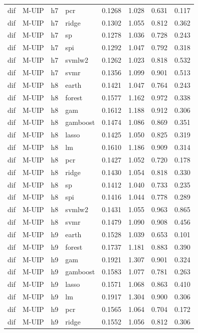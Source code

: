 \begin{ThreePartTable}
\begin{longtable}[t]{llclcccc}
dif & M-UIP & h7 & pcr & 0.1268 & 1.028 & 0.631 & 0.117\\
dif & M-UIP & h7 & ridge & 0.1302 & 1.055 & 0.812 & 0.362\\
dif & M-UIP & h7 & sp & 0.1278 & 1.036 & 0.728 & 0.243\\
dif & M-UIP & h7 & spi & 0.1292 & 1.047 & 0.792 & 0.318\\
dif & M-UIP & h7 & svmlw2 & 0.1262 & 1.023 & 0.818 & 0.532\\
dif & M-UIP & h7 & svmr & 0.1356 & 1.099 & 0.901 & 0.513\\
\addlinespace
dif & M-UIP & h8 & earth & 0.1421 & 1.047 & 0.764 & 0.243\\
dif & M-UIP & h8 & forest & 0.1577 & 1.162 & 0.972 & 0.338\\
dif & M-UIP & h8 & gam & 0.1612 & 1.188 & 0.912 & 0.306\\
dif & M-UIP & h8 & gamboost & 0.1474 & 1.086 & 0.869 & 0.351\\
dif & M-UIP & h8 & lasso & 0.1425 & 1.050 & 0.825 & 0.319\\
dif & M-UIP & h8 & lm & 0.1610 & 1.186 & 0.909 & 0.314\\
dif & M-UIP & h8 & pcr & 0.1427 & 1.052 & 0.720 & 0.178\\
dif & M-UIP & h8 & ridge & 0.1430 & 1.054 & 0.818 & 0.330\\
dif & M-UIP & h8 & sp & 0.1412 & 1.040 & 0.733 & 0.235\\
dif & M-UIP & h8 & spi & 0.1416 & 1.044 & 0.778 & 0.289\\
dif & M-UIP & h8 & svmlw2 & 0.1431 & 1.055 & 0.963 & 0.865\\
dif & M-UIP & h8 & svmr & 0.1479 & 1.090 & 0.908 & 0.456\\
\addlinespace
dif & M-UIP & h9 & earth & 0.1528 & 1.039 & 0.653 & 0.101\\
dif & M-UIP & h9 & forest & 0.1737 & 1.181 & 0.883 & 0.390\\
dif & M-UIP & h9 & gam & 0.1921 & 1.307 & 0.901 & 0.324\\
dif & M-UIP & h9 & gamboost & 0.1583 & 1.077 & 0.781 & 0.263\\
dif & M-UIP & h9 & lasso & 0.1571 & 1.068 & 0.863 & 0.410\\
dif & M-UIP & h9 & lm & 0.1917 & 1.304 & 0.900 & 0.306\\
dif & M-UIP & h9 & pcr & 0.1565 & 1.064 & 0.704 & 0.172\\
dif & M-UIP & h9 & ridge & 0.1552 & 1.056 & 0.812 & 0.306\\

\end{longtable}
\end{ThreePartTable}
